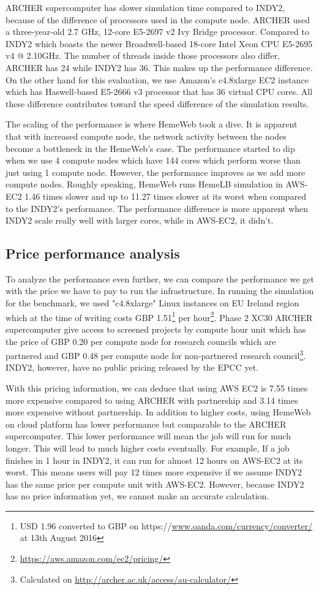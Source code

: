 ARCHER supercomputer has slower simulation time compared to INDY2, because of the difference of processors used in the compute node. ARCHER used a three-year-old 2.7 GHz, 12-core E5-2697 v2 Ivy Bridge processor. Compared to INDY2 which boasts the newer Broadwell-based 18-core Intel Xeon CPU E5-2695 v4 @ 2.10GHz. The number of threads inside those processors also differ, ARCHER has 24 while INDY2 has 36. This makes up the performance difference. On the other hand for this evaluation, we use Amazon's c4.8xlarge EC2 instance which has Haswell-based E5-2666 v3 processor that has 36 virtual CPU cores. All these difference contributes toward the speed difference of the simulation results.

The scaling of the performance is where HemeWeb took a dive. It is apparent that with increased compute node, the network activity between the nodes become a bottleneck in the HemeWeb's case. The performance started to dip when we use 4 compute nodes which have 144 cores which perform worse than just using 1 compute node. However, the performance improves as we add more compute nodes. Roughly speaking, HemeWeb runs HemeLB simulation in AWS-EC2 1.46 times slower and up to 11.27 times slower at its worst when compared to the INDY2's performance. The performance difference is more apparent when INDY2 scale really well with larger cores, while in AWS-EC2, it didn't.

\subsection{Price performance analysis}

To analyze the performance even further, we can compare the performance we get with the price we have to pay to run the infrastructure. In running the simulation for the benchmark, we used "c4.8xlarge" Linux instances on EU Ireland region which at the time of writing costs GBP 1.51\footnote{USD 1.96 converted to GBP on https://\url{www.oanda.com/currency/converter/} at 13th August 2016} per hour\footnote{\url{https://aws.amazon.com/ec2/pricing/}}. Phase 2 XC30 ARCHER supercomputer give access to screened projects by compute hour unit which has the price of GBP 0.20 per compute node for research councils which are partnered and GBP 0.48 per compute node for non-partnered research council\footnote{Calculated on \url{http://archer.ac.uk/access/au-calculator/}}. INDY2, however, have no public pricing released by the EPCC yet.

With this pricing information, we can deduce that using AWS EC2 is 7.55 times more expensive compared to using ARCHER with partnership and 3.14 times more expensive without partnership. In addition to higher costs, using HemeWeb on cloud platform has lower performance but comparable to the ARCHER supercomputer. This lower performance will mean the job will run for much longer. This will lead to much higher costs eventually. For example, If a job finishes in 1 hour in INDY2, it can run for almost 12 hours on AWS-EC2 at its worst. This means users will pay 12 times more expensive if we assume INDY2 has the same price per compute unit with AWS-EC2. However, because INDY2 has no price information yet, we cannot make an accurate calculation.

